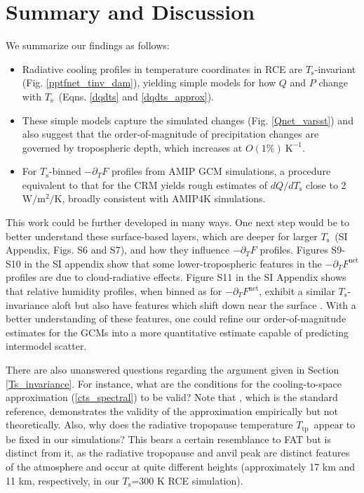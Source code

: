 \documentclass[9pt,twocolumn,twoside,lineno]{pnas-new}
\newcommand{\ppt}{\ensuremath{\partial_T}}
\newcommand{\Fnet}{\ensuremath{F^\mathrm{net}}}
\newcommand{\WmsqK}{\ensuremath{\mathrm{W/m^2/K}}}
\newcommand{\Kinverse}{\ensuremath{\mathrm{K^{-1}}}}
\newcommand{\Ts}{\ensuremath{T_\mathrm{s}}}
\newcommand{\Ttp}{\ensuremath{T_\mathrm{tp}}}
\begin{document}
\section{Summary and Discussion}
\label{sec_summary}
We summarize our findings as follows:
	\begin{itemize}
		\item Radiative cooling profiles in temperature coordinates in RCE are  \Ts-invariant (Fig. \ref{pptfnet_tinv_dam}), yielding simple models for how $Q$ and $P$ change with \Ts\ (Eqns. \ref{dqdts} and \ref{dqdts_approx}). 
		\item These simple models capture the simulated changes (Fig. \ref{Qnet_varsst}) and also suggest  that the order-of-magnitude of precipitation changes are governed by tropospheric depth, which increases at $O(1\%)\ \Kinverse$.
		\item For \Ts-binned $-\ppt F$ profiles from AMIP GCM simulations, a procedure equivalent to that for the CRM yields  rough estimates of $dQ/d\Ts$ close to  2\ \WmsqK, broadly consistent with AMIP4K simulations.
	\end{itemize}
		
 This work could be further developed in many ways. One next step would be to better understand these surface-based layers, which are deeper for larger \Ts\ (SI Appendix, Figs. S6 and S7), and how they influence $-\ppt F$ profiles. Figures S9-S10 in the SI appendix show that some lower-tropospheric features in the $-\ppt\Fnet$ profiles are due to cloud-radiative effects. Figure S11 in the SI Appendix shows that  relative humidity profiles,  when binned as for $-\ppt \Fnet$, exhibit a similar \Ts-invariance aloft \citep[in line with the CRM results of][]{romps2014} but also have features which shift down near the surface \citep[see also][]{cronin2017}.  With a better understanding of these features, one could refine our order-of-magnitude estimates for the GCMs into a more quantitative estimate capable of predicting intermodel scatter.
 
 There are also unanswered questions regarding the  argument given in Section \ref{Ts_invariance}. For instance, what are the conditions for the cooling-to-space approximation (\eqref{cts_spectral}) to be valid? Note that \cite{rodgers1966}, which is the standard reference, demonstrates the validity of the approximation empirically but not theoretically. Also, why does  the radiative tropopause temperature \Ttp\ appear to be fixed in our simulations? This bears a certain resemblance to FAT  but is distinct from it, as the radiative tropopause and anvil peak are distinct features of the atmosphere and occur at quite different heights (approximately 17 km and 11 km, respectively, in our \Ts=300 K RCE simulation). 
 
\end{document}
